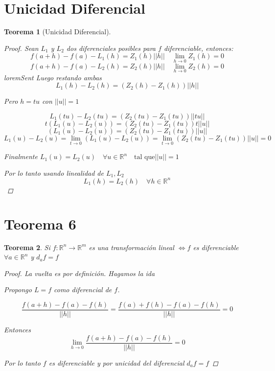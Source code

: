 \documentclass{article}
\theoremstyle{break}
\newtheorem{theorem}{Teorema}[section]
\begin{document}
\section{Unicidad Diferencial}
\begin{theorem}[Unicidad Diferencial]
  \begin{proof}
    Sean $L_1$ y $L_2$ dos diferenciales posibles para $f$ diferenciable, entonces:
    $$ f(a+h) - f(a) - L_1(h) = Z_1(h)||h|| \quad \lim_{h\rightarrow 0} Z_1(h) = 0 $$
    $$ f(a+h) - f(a) - L_2(h) = Z_2(h)||h|| \quad \lim_{h\rightarrow 0} Z_2(h) = 0 $$
loremSent
    Luego restando ambas 
    $$L_1(h) - L_2(h) = (Z_2(h) - Z_1(h))||h||$$

    Pero $h = tu$ con $||u||=1$

    $$L_1(tu) - L_2(tu) = (Z_2(tu) - Z_1(tu))||tu|| $$
    $$t(L_1(u) - L_2(u)) = (Z_2(tu) - Z_1(tu))t||u||$$
    $$(L_1(u) - L_2(u)) = (Z_2(tu) - Z_1(tu))||u|| $$
    $$L_1(u) - L_2(u) = \lim_{t \rightarrow 0}( L_1(u) - L_2(u)) = \lim_{t \rightarrow 0 } (Z_2(tu) - Z_1(tu))||u|| = 0 $$

    Finalmente $L_1(u) = L_2(u) \quad \forall u \in \mathbb{R}^{n} \quad \text{tal que} ||u|| = 1$

    Por lo tanto usando linealidad de $L_1,L_2$ 
    $$L_1(h) = L_2(h) \quad \forall h \in \mathbb{R}^{n} $$

  \end{proof}
\end{theorem}

\section{Teorema 6}
\begin{theorem}
  Si $f:\mathbb{R}^{n} \longrightarrow \mathbb{R}^{m}$ es  una transformación lineal $\iff f$ es diferenciable
  $\forall a \in \mathbb{R}^{n} $ y $d_a f = f$
  \begin{proof}
    La vuelta es por definición. Hagamos la ida

    Propongo $L = f$ como diferencial de $f$.

    $$\frac{f(a+h) - f(a) - f(h)}{||h||} = \frac{f(a)+ f(h) - f(a) - f(h)}{||h||} = 0$$

    Entonces $$\lim_{h \rightarrow 0 } \frac{f(a+h) - f(a) - f(h)}{||h||} = 0$$

    Por lo tanto $f$ es diferenciable y por unicidad del diferencial $d_a f = f$
  \end{proof}
\end{theorem}
\end{document}
